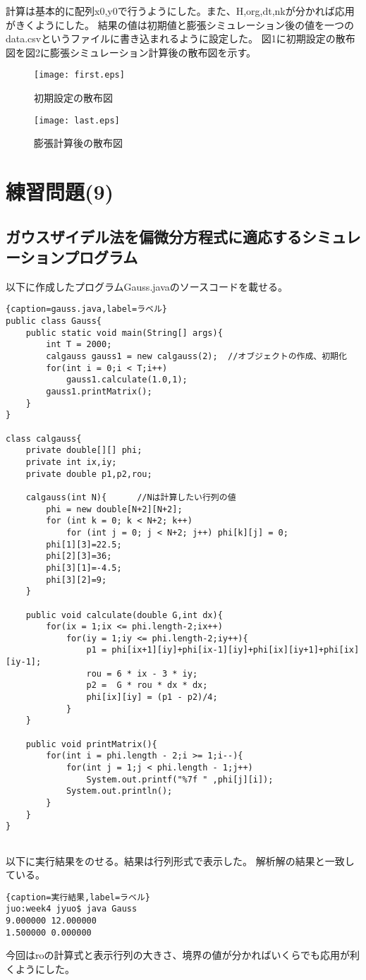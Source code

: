 \documentclass[a4j,11pt]{jarticle}
\begin{document}
計算は基本的に配列x0,y0で行うようにした。また、H,org,dt,nkが分かれば応用がきくようにした。
結果の値は初期値と膨張シミュレーション後の値を一つのdata.csvというファイルに書き込まれるように設定した。
図1に初期設定の散布図を図2に膨張シミュレーション計算後の散布図を示す。
\begin{figure}[htbp]
\begin{center}
\texttt{[image: first.eps]}
\end{center}
\caption{初期設定の散布図}
\label{fig:one}
\end{figure}


\begin{figure}[htbp]
\begin{center}
\texttt{[image: last.eps]}
\end{center}
\caption{膨張計算後の散布図}
\label{fig:one}
\end{figure}


\section*{練習問題(9)}
\subsection*{ガウスザイデル法を偏微分方程式に適応するシミュレーションプログラム}

以下に作成したプログラムGauss.javaのソースコードを載せる。
\begin{lstlisting}{caption=gauss.java,label=ラベル}
public class Gauss{
    public static void main(String[] args){
        int T = 2000;
        calgauss gauss1 = new calgauss(2);  //オブジェクトの作成、初期化
        for(int i = 0;i < T;i++) 
            gauss1.calculate(1.0,1);
        gauss1.printMatrix();
    }
}

class calgauss{
    private double[][] phi;
    private int ix,iy;
    private double p1,p2,rou;

    calgauss(int N){      //Nは計算したい行列の値
        phi = new double[N+2][N+2];
        for (int k = 0; k < N+2; k++) 
            for (int j = 0; j < N+2; j++) phi[k][j] = 0;
        phi[1][3]=22.5;
        phi[2][3]=36;
        phi[3][1]=-4.5;
        phi[3][2]=9;
    }

    public void calculate(double G,int dx){
        for(ix = 1;ix <= phi.length-2;ix++)
            for(iy = 1;iy <= phi.length-2;iy++){
                p1 = phi[ix+1][iy]+phi[ix-1][iy]+phi[ix][iy+1]+phi[ix][iy-1];
                rou = 6 * ix - 3 * iy;
                p2 =  G * rou * dx * dx;
                phi[ix][iy] = (p1 - p2)/4;
            }
    }

    public void printMatrix(){
        for(int i = phi.length - 2;i >= 1;i--){
            for(int j = 1;j < phi.length - 1;j++)
                System.out.printf("%7f " ,phi[j][i]);
            System.out.println();
        }
    }
}


\end{lstlisting}

以下に実行結果をのせる。結果は行列形式で表示した。
解析解の結果と一致している。
\begin{lstlisting}{caption=実行結果,label=ラベル}
juo:week4 jyuo$ java Gauss
9.000000 12.000000 
1.500000 0.000000 
\end{lstlisting}    
今回はroの計算式と表示行列の大きさ、境界の値が分かればいくらでも応用が利くようにした。
\end{document}

